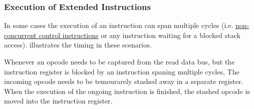 \subsubsection{Execution of Extended Instructions}
\label{architecture:excyc:extended}

In some cases the execution of an instruction can span multiple cycles (i.e. \hyperref[opcodes:ctrl]{non-concurrent control instructions}
or any instruction waiting for a blocked stack access). 
 illustrates the timing in these scenarios.

Whenever an opcode needs to be captured from the read data bus, but the instruction register is blocked by an instruction spaning multiple cycles,
The incoming opcode needs to be temourarely stashed away in a separate register.
When the execution of the ongoing instruction is finished, the stashed opcode is moved into the instruction register.

